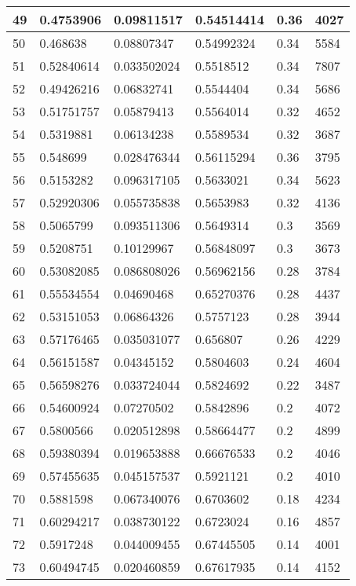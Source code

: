 \begin{longtable}{|l|l|l|l|l|l|}
49 & 0.4753906 & 0.09811517 & 0.54514414 & 0.36 & 4027 \\ \hline 
50 & 0.468638 & 0.08807347 & 0.54992324 & 0.34 & 5584 \\ \hline 
51 & 0.52840614 & 0.033502024 & 0.5518512 & 0.34 & 7807 \\ \hline 
52 & 0.49426216 & 0.06832741 & 0.5544404 & 0.34 & 5686 \\ \hline 
53 & 0.51751757 & 0.05879413 & 0.5564014 & 0.32 & 4652 \\ \hline 
54 & 0.5319881 & 0.06134238 & 0.5589534 & 0.32 & 3687 \\ \hline 
55 & 0.548699 & 0.028476344 & 0.56115294 & 0.36 & 3795 \\ \hline 
56 & 0.5153282 & 0.096317105 & 0.5633021 & 0.34 & 5623 \\ \hline 
57 & 0.52920306 & 0.055735838 & 0.5653983 & 0.32 & 4136 \\ \hline 
58 & 0.5065799 & 0.093511306 & 0.5649314 & 0.3 & 3569 \\ \hline 
59 & 0.5208751 & 0.10129967 & 0.56848097 & 0.3 & 3673 \\ \hline 
60 & 0.53082085 & 0.086808026 & 0.56962156 & 0.28 & 3784 \\ \hline 
61 & 0.55534554 & 0.04690468 & 0.65270376 & 0.28 & 4437 \\ \hline 
62 & 0.53151053 & 0.06864326 & 0.5757123 & 0.28 & 3944 \\ \hline 
63 & 0.57176465 & 0.035031077 & 0.656807 & 0.26 & 4229 \\ \hline 
64 & 0.56151587 & 0.04345152 & 0.5804603 & 0.24 & 4604 \\ \hline 
65 & 0.56598276 & 0.033724044 & 0.5824692 & 0.22 & 3487 \\ \hline 
66 & 0.54600924 & 0.07270502 & 0.5842896 & 0.2 & 4072 \\ \hline 
67 & 0.5800566 & 0.020512898 & 0.58664477 & 0.2 & 4899 \\ \hline 
68 & 0.59380394 & 0.019653888 & 0.66676533 & 0.2 & 4046 \\ \hline 
69 & 0.57455635 & 0.045157537 & 0.5921121 & 0.2 & 4010 \\ \hline 
70 & 0.5881598 & 0.067340076 & 0.6703602 & 0.18 & 4234 \\ \hline 
71 & 0.60294217 & 0.038730122 & 0.6723024 & 0.16 & 4857 \\ \hline 
72 & 0.5917248 & 0.044009455 & 0.67445505 & 0.14 & 4001 \\ \hline 
73 & 0.60494745 & 0.020460859 & 0.67617935 & 0.14 & 4152 \\ \hline 

\end{longtable}
